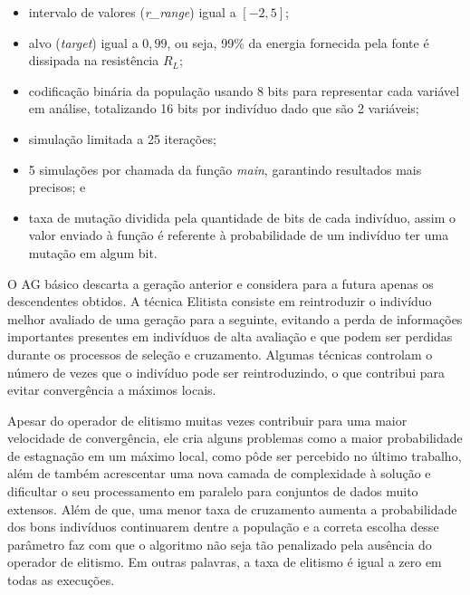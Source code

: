 \documentclass[12pt]{article}
\begin{document}
\begin{itemize}
    \item intervalo de valores (\textit{r\_range}) igual a $\left[-2,5\right]$;
    \item alvo (\textit{target}) igual a $0,99$, ou seja, 99\% da energia fornecida pela fonte é dissipada na resistência $R_L$;
    \item codificação binária da população usando 8 bits para representar cada variável em análise, totalizando 16 bits por indivíduo dado que são 2 variáveis;
    \item simulação limitada a 25 iterações;
    \item 5 simulações por chamada da função \textit{main}, garantindo resultados mais precisos; e
    \item taxa de mutação dividida pela quantidade de bits de cada indivíduo, assim o valor enviado à função é referente à probabilidade de um indivíduo ter uma mutação em algum bit.
\end{itemize}

\begin{quoting}[rightmargin=0cm,leftmargin=4cm]
\begin{singlespace}
{\footnotesize 
O AG básico descarta a geração anterior e considera para a futura apenas os descendentes obtidos. A técnica Elitista consiste em reintroduzir o indivíduo melhor avaliado de uma geração para a seguinte, evitando a perda de informações importantes presentes em indivíduos de alta avaliação e que podem ser perdidas durante os processos de seleção e cruzamento. Algumas técnicas controlam o número de vezes que o indivíduo pode ser reintroduzindo, o que contribui para evitar convergência a máximos locais. \cite[p. 6]{bento_algoritmos_2008}
}
\end{singlespace}
\end{quoting}

Apesar do operador de elitismo muitas vezes contribuir para uma maior velocidade de convergência, ele cria alguns problemas como a maior probabilidade de estagnação em um máximo local, como pôde ser percebido no último trabalho, além de também acrescentar uma nova camada de complexidade à solução e dificultar o seu processamento em paralelo para conjuntos de dados muito extensos. Além de que, uma menor taxa de cruzamento aumenta a probabilidade dos bons indivíduos continuarem dentre a população e a correta escolha desse parâmetro faz com que o algoritmo não seja tão penalizado pela ausência do operador de elitismo. Em outras palavras, a taxa de elitismo é igual a zero em todas as execuções.
\end{document}
